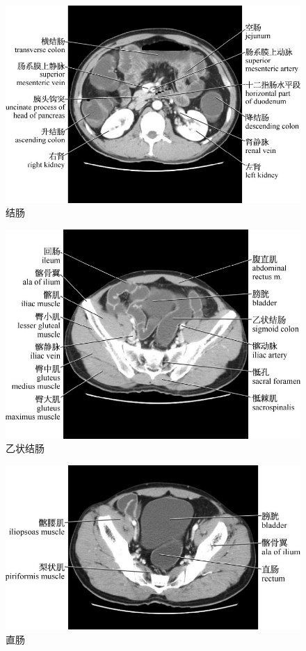 \begin{figure}[!htbp]
 \centering
 \includegraphics{./images/Image00172.jpg}
 \captionsetup{justification=centering}
 \caption{结肠}
  \end{figure} 
 \FloatBarrier

\begin{figure}[!htbp]
 \centering
 \includegraphics{./images/Image00173.jpg}
 \captionsetup{justification=centering}
 \caption{乙状结肠}
  \end{figure} 
 \FloatBarrier

\begin{figure}[!htbp]
 \centering
 \includegraphics{./images/Image00174.jpg}
 \captionsetup{justification=centering}
 \caption{直肠}
  \end{figure} 
 \FloatBarrier

